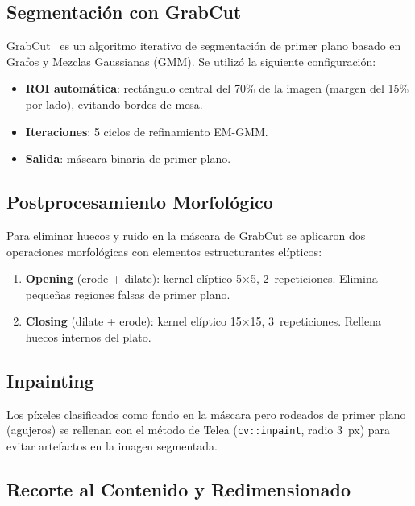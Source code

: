 \documentclass[12pt,a4paper]{article}
\begin{document}
\subsection{Segmentación con GrabCut}

GrabCut~\cite{rother2004grabcut} es un algoritmo iterativo de
segmentación de primer plano basado en Grafos y Mezclas Gaussianas
(GMM).  Se utilizó la siguiente configuración:

\begin{itemize}[nosep]
  \item \textbf{ROI automática}: rectángulo central del 70\% de la
        imagen (margen del 15\% por lado), evitando bordes de mesa.
  \item \textbf{Iteraciones}: 5 ciclos de refinamiento EM-GMM.
  \item \textbf{Salida}: máscara binaria de primer plano.
\end{itemize}

\subsection{Postprocesamiento Morfológico}

Para eliminar huecos y ruido en la máscara de GrabCut se aplicaron
dos operaciones morfológicas con elementos estructurantes elípticos:

\begin{enumerate}[nosep]
  \item \textbf{Opening} (erode + dilate): kernel elíptico 5×5,
        2~repeticiones.  Elimina pequeñas regiones falsas de primer
        plano.
  \item \textbf{Closing} (dilate + erode): kernel elíptico 15×15,
        3~repeticiones.  Rellena huecos internos del plato.
\end{enumerate}

\subsection{Inpainting}

Los píxeles clasificados como fondo en la máscara pero rodeados de
primer plano (agujeros) se rellenan con el método de Telea
(\texttt{cv::inpaint}, radio 3~px) para evitar artefactos en la
imagen segmentada.

\subsection{Recorte al Contenido y Redimensionado}
\end{document}
